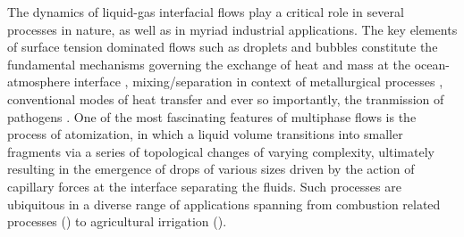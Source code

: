 The dynamics of liquid-gas interfacial flows play a critical role in several processes in nature, 
as well as in myriad industrial applications. 
The key elements of surface tension dominated flows such as droplets and bubbles constitute the  
fundamental mechanisms governing the exchange of heat and mass at the ocean-atmosphere interface \cite{seinfeld1998air,deike}, 
mixing/separation in context of metallurgical processes \cite{johansen1988fluid,metal},  
conventional modes of heat transfer \cite{deckwer1980mechanism,bubble}
and ever so importantly, the tranmission of pathogens \cite{lydia_1,lydia_2}. 
One of the most fascinating features of multiphase flows is the process of atomization, 
in which a liquid volume transitions into smaller fragments via a series of topological 
changes of varying complexity, ultimately resulting in the emergence of drops of various sizes
driven by the action of capillary forces at the interface separating the fluids.  
Such processes are ubiquitous in a diverse range of applications spanning from combustion related processes 
(\cite{lefebvre2017atomization,bayvel1993liquid}) to agricultural irrigation (\cite{lake1977effect,reichenberger2007mitigation}).    


